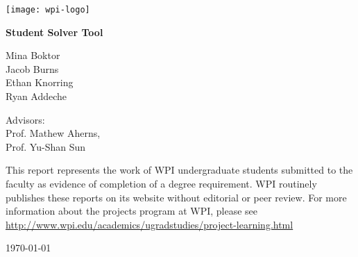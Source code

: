 \begin{titlepage}
	\centering
	\texttt{[image: wpi-logo]}\par\vspace{2cm}

	{\Huge \bfseries Student Solver Tool \par}
	\vspace{1.5cm}

	{\Large Mina Boktor \\ Jacob Burns \\ Ethan Knorring \\ Ryan Addeche \par}
	\vspace{1cm}

	{\large Advisors: \\ Prof. Mathew Aherns, \\ Prof. Yu-Shan Sun\par}
	\vfill

	{\small This report represents the work of WPI undergraduate students submitted to the faculty as evidence of completion of a degree requirement. WPI routinely publishes these reports on its website without editorial or peer review. For more information about the projects program at WPI, please see \url{http://www.wpi.edu/academics/ugradstudies/project-learning.html}\par}

	\vspace{1cm}
	{\large \today \par}
\end{titlepage}
